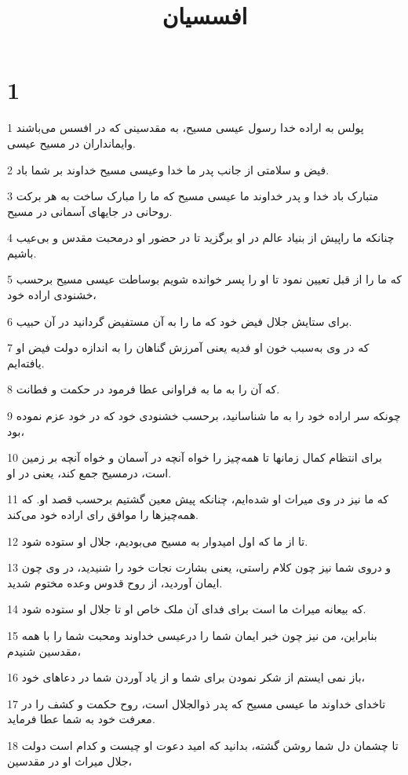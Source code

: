 

\title{افسسيان}


\chapter{1}

\par 1 پولس به اراده خدا رسول عیسی مسیح، به مقدسینی که در افسس می‌باشند وایمانداران در مسیح عیسی.
\par 2 فیض و سلامتی از جانب پدر ما خدا وعیسی مسیح خداوند بر شما باد.
\par 3 متبارک باد خدا و پدر خداوند ما عیسی مسیح که ما را مبارک ساخت به هر برکت روحانی در جایهای آسمانی در مسیح.
\par 4 چنانکه ما راپیش از بنیاد عالم در او برگزید تا در حضور او درمحبت مقدس و بی‌عیب باشیم.
\par 5 که ما را از قبل تعیین نمود تا او را پسر خوانده شویم بوساطت عیسی مسیح برحسب خشنودی اراده خود،
\par 6 برای ستایش جلال فیض خود که ما را به آن مستفیض گردانید در آن حبیب.
\par 7 که در وی به‌سبب خون او فدیه یعنی آمرزش گناهان را به اندازه دولت فیض او یافته‌ایم.
\par 8 که آن را به ما به فراوانی عطا فرمود در حکمت و فطانت.
\par 9 چونکه سر اراده خود را به ما شناسانید، برحسب خشنودی خود که در خود عزم نموده بود،
\par 10 برای انتظام کمال زمانها تا همه‌چیز را خواه آنچه در آسمان و خواه آنچه بر زمین است، درمسیح جمع کند، یعنی در او.
\par 11 که ما نیز در وی میراث او شده‌ایم، چنانکه پیش معین گشتیم برحسب قصد او. که همه‌چیزها را موافق رای اراده خود می‌کند.
\par 12 تا از ما که اول امیدوار به مسیح می‌بودیم، جلال او ستوده شود.
\par 13 و دروی شما نیز چون کلام راستی، یعنی بشارت نجات خود را شنیدید، در وی چون ایمان آوردید، از روح قدوس وعده مختوم شدید.
\par 14 که بیعانه میراث ما است برای فدای آن ملک خاص او تا جلال او ستوده شود.
\par 15 بنابراین، من نیز چون خبر ایمان شما را درعیسی خداوند ومحبت شما را با همه مقدسین شنیدم،
\par 16 باز نمی ایستم از شکر نمودن برای شما و از یاد آوردن شما در دعاهای خود،
\par 17 تاخدای خداوند ما عیسی مسیح که پدر ذوالجلال است، روح حکمت و کشف را در معرفت خود به شما عطا فرماید.
\par 18 تا چشمان دل شما روشن گشته، بدانید که امید دعوت او چیست و کدام است دولت جلال میراث او در مقدسین،
